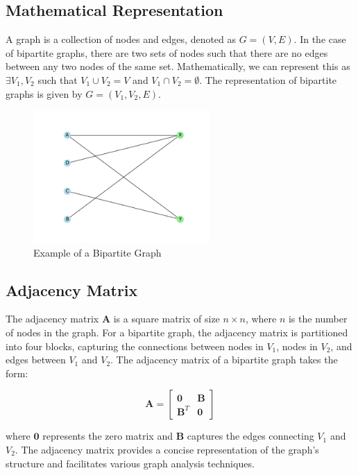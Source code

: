 \documentclass{article}
\newcommand{\mat}[1]{\mathbf{#1}}
\begin{document}
\subsection{Mathematical Representation}
A graph is a collection of nodes and edges, denoted as $G=(V,E)$. In the case of bipartite graphs, there are two sets of nodes such that there are no edges between any two nodes of the same set. Mathematically, we can represent this as $\exists V_1, V_2$ such that $V_1 \cup V_2 = V$ and $V_1 \cap V_2 = \emptyset$. The representation of bipartite graphs is given by $G = (V_1, V_2, E)$.

\begin{figure}[h]
\centering
\includegraphics[width=0.6\textwidth]{Graph.png}
\caption{Example of a Bipartite Graph}
\label{fig:bipartite_graph}
\end{figure}

\subsection{Adjacency Matrix}
The adjacency matrix $\mat{A}$ is a square matrix of size $n \times n$, where $n$ is the number of nodes in the graph. For a bipartite graph, the adjacency matrix is partitioned into four blocks, capturing the connections between nodes in $V_1$, nodes in $V_2$, and edges between $V_1$ and $V_2$. The adjacency matrix of a bipartite graph takes the form:

\[
\mat{A} = 
\begin{bmatrix}
\mat{0} & \mat{B} \\
\mat{B}^T & \mat{0}
\end{bmatrix}
\]

where $\mat{0}$ represents the zero matrix and $\mat{B}$ captures the edges connecting $V_1$ and $V_2$. The adjacency matrix provides a concise representation of the graph's structure and facilitates various graph analysis techniques.
\end{document}
